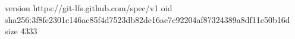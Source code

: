 version https://git-lfs.github.com/spec/v1
oid sha256:3f8fe2301c146ac85f4d7523db82de16ae7c92204af87324389a8df11e50b16d
size 4333
